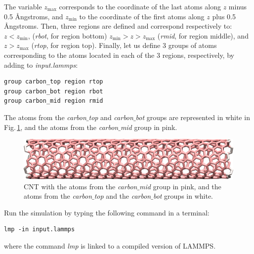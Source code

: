\documentclass[9pt,tutorial]{livecoms}
\begin{document}
\noindent The variable $z_\mathrm{max}$ corresponds to the coordinate of the last atoms along $z$ minus 0.5 Ångstroms, and $z_\mathrm{min}$ to the coordinate of the first atoms along $z$ plus 0.5 Ångstroms. Then, three regions are defined and correspond respectively to: $z < z_\mathrm{min}$, (\textit{rbot}, for region bottom) $z_\mathrm{min} > z > z_\mathrm{max}$ (\textit{rmid}, for region middle), and $z > z_\mathrm{max}$ (\textit{rtop}, for region top). Finally, let us define 3 groups of atoms corresponding to the atoms located in each of the 3 regions, respectively, by adding to \textit{input.lammps}:
{\normalsize \begin{verbatim}
group carbon_top region rtop
group carbon_bot region rbot
group carbon_mid region rmid
\end{verbatim}}
The atoms from the \textit{carbon$\_$top} and \textit{carbon$\_$bot} groups are represented in white in Fig.\,\ref{fig:CNT-underformed}, and the atoms from the \textit{carbon$\_$mid} group in pink.

\begin{figure}
\centering
\includegraphics[width=\linewidth]{CNT-underformed}
\caption{CNT with the atoms from the \textit{carbon$\_$mid} group in pink, and the atoms from the \textit{carbon$\_$top} and the \textit{carbon$\_$bot} groups in white.}
\label{fig:CNT-underformed}
\end{figure}

{\color{blue}Run the simulation by typing the following command in a terminal:}
{\normalsize \begin{verbatim}
lmp -in input.lammps
\end{verbatim}}
{\color{blue}where the command \textit{lmp} is linked to a compiled version of LAMMPS.}
\end{document}
